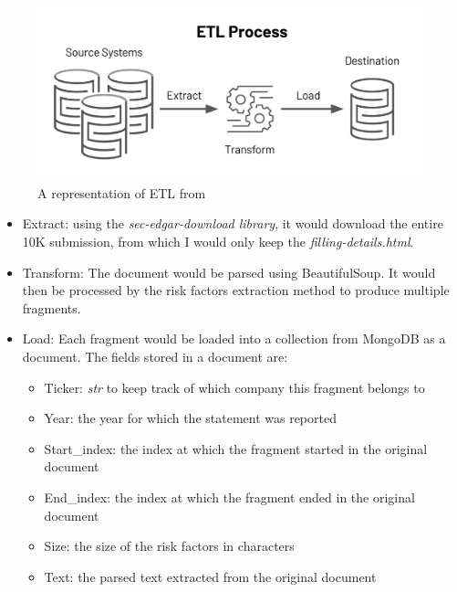 \documentclass[12pt,MSc,a4paper,oneside]{muthesis}
\begin{document}
\begin{figure}[h]
    \centering
    \includegraphics[scale=0.3]{images/abstract/ETL-Process.jpeg}
    \caption{A representation of ETL from \cite{etl}}
\end{figure}

\begin{itemize}
  \item Extract: using the \textit{sec-edgar-download library}, it would download the entire 10K submission, from which I would only keep the \textit{filling-details.html}.
  \item Transform: The document would be parsed using BeautifulSoup. It would then be processed by the risk factors extraction method to produce multiple fragments.
  \item Load: Each fragment would be loaded into a collection from MongoDB as a document. The fields stored in a document are:
      \begin{itemize}
          \item Ticker: \textit{str} to keep track of which company this fragment belongs to
          \item Year: the year for which the statement was reported
          \item Start\_index: the index at which the fragment started in the original document
          \item End\_index: the index at which the fragment ended in the original document
          \item Size: the size of the risk factors in characters
          \item Text: the parsed text extracted from the original document
      \end{itemize}
\end{itemize}
\end{document}
